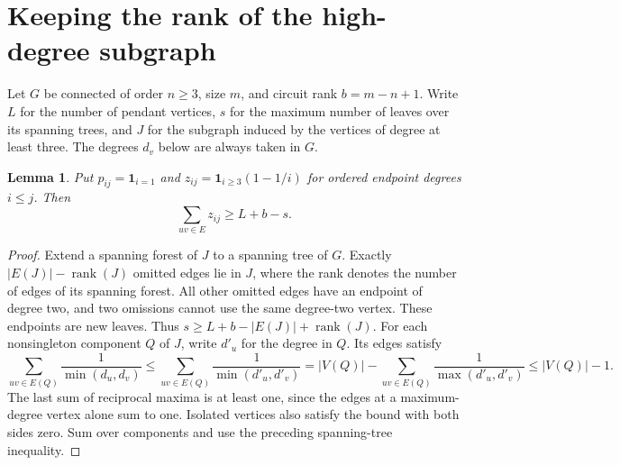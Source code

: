 \documentclass[11pt,a4paper]{article}
\newtheorem{lemma}[theorem]{Lemma}\newtheorem{corollary}[theorem]{Corollary}
\begin{document}
\section{Keeping the rank of the high-degree subgraph}
Let $G$ be connected of order $n\ge3$, size $m$, and circuit rank
$b=m-n+1$. Write $L$ for the number of pendant vertices, $s$ for the
maximum number of leaves over its spanning trees, and $J$ for the
subgraph induced by the vertices of degree at least three. The degrees
$d_v$ below are always taken in $G$.
\begin{lemma}\label{p07-lem:ranklocal}
Put $p_{ij}=\mathbf{1}_{i=1}$ and $z_{ij}=\mathbf{1}_{i\ge3}(1-1/i)$
for ordered endpoint degrees $i\le j$. Then
\[
  \sum_{uv\in E}z_{ij}\ge L+b-s.
\]
\end{lemma}
\begin{proof}
Extend a spanning forest of $J$ to a spanning tree of $G$. Exactly
$|E(J)|-\operatorname{rank}(J)$ omitted edges lie in $J$, where the
rank denotes the number of edges of its spanning forest. All other
omitted edges have an endpoint of degree two, and two omissions cannot
use the same degree-two vertex. These endpoints are new leaves. Thus
$s\ge L+b-|E(J)|+\operatorname{rank}(J)$.
For each nonsingleton component $Q$ of $J$, write $d'_u$ for the
degree in $Q$. Its edges satisfy
\[
 \sum_{uv\in E(Q)}\frac1{\min(d_u,d_v)}
 \le \sum_{uv\in E(Q)}\frac1{\min(d'_u,d'_v)}
 = |V(Q)|-\sum_{uv\in E(Q)}\frac1{\max(d'_u,d'_v)}
 \le |V(Q)|-1.
\]
The last sum of reciprocal maxima is at least one, since the edges
at a maximum-degree vertex alone sum to one. Isolated vertices also
satisfy the bound with both sides zero. Sum over components and use
the preceding spanning-tree inequality.
\end{proof}
\end{document}
